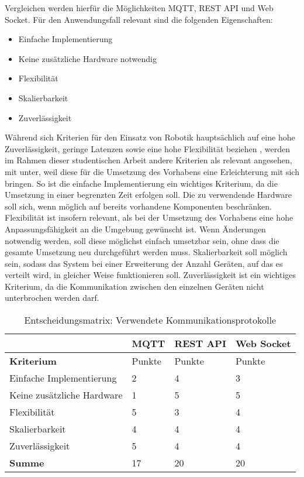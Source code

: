 Vergleichen werden hierfür die Möglichkeiten MQTT, REST API und Web Socket. Für den Anwendungsfall relevant sind die folgenden Eigenschaften:
\begin{itemize}
  \item Einfache Implementierung
  \item Keine zusätzliche Hardware notwendig
  \item Flexibilität
  \item Skalierbarkeit
  \item Zuverlässigkeit
\end{itemize}

Während sich Kriterien für den Einsatz von Robotik hauptsächlich auf eine hohe Zuverlässigkeit, geringe Latenzen sowie eine hohe Flexibilität beziehen \cite{AMARAN2015400}, werden im Rahmen dieser studentischen Arbeit andere Kriterien als relevant angesehen, mit unter, weil diese für die Umsetzung des Vorhabens eine Erleichterung mit sich bringen. So ist die einfache Implementierung ein wichtiges Kriterium, da die Umsetzung in einer begrenzten Zeit erfolgen soll. Die zu verwendende Hardware soll sich, wenn möglich auf bereits vorhandene Komponenten beschränken. Flexibilität ist insofern relevant, als bei der Umsetzung des Vorhabens eine hohe Anpassungsfähigkeit an die Umgebung gewünscht ist. Wenn Änderungen notwendig werden, soll diese möglichst einfach umsetzbar sein, ohne dass die gesamte Umsetzung neu durchgeführt werden muss. Skalierbarkeit soll möglich sein, sodass das System bei einer Erweiterung der Anzahl Geräten, auf das es verteilt wird, in gleicher Weise funktionieren soll. Zuverlässigkeit ist ein wichtiges Kriterium, da die Kommunikation zwischen den einzelnen Geräten nicht unterbrochen werden darf.
\begin{table}[H]
  \renewcommand{\arraystretch}{1.2}
  \caption{Entscheidungsmatrix: Verwendete Kommunikationsprotokolle}
  \label{tab:decision-matrix-communication}
  \begin{tabularx}{\textwidth}{|X|X|X|X|}
      \hline
      & \textbf{MQTT} & \textbf{REST API} & \textbf{Web Socket} \\
      \hline
      \textbf{Kriterium} & Punkte & Punkte & Punkte \\
      \hline
      Einfache Implementierung & 2 & 4 & 3 \\
      \hline
      Keine zusätzliche Hardware & 1 & 5 & 5 \\
      \hline
      Flexibilität & 5 & 3 & 4 \\
      \hline
      Skalierbarkeit & 4 & 4 & 4 \\
      \hline
      Zuverlässigkeit & 5 & 4 & 4 \\
      \hline
      \rowcolor{gray!50}
      \textbf{Summe} & 17 & 20 & 20 \\
      \hline
  \end{tabularx}
\end{table}

